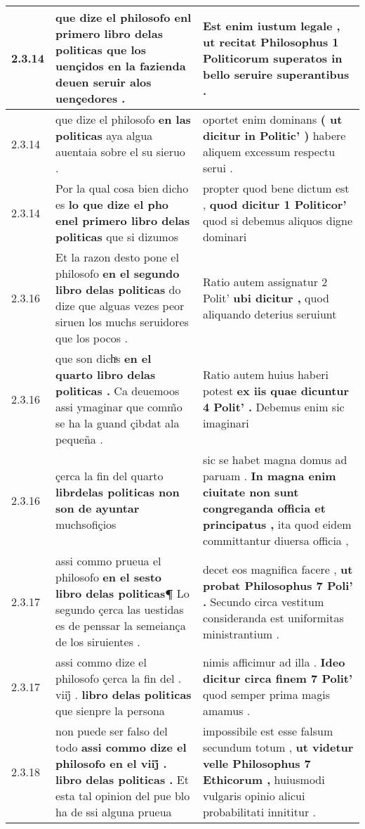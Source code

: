\begin{tabular}{|p{1cm}|p{6.5cm}|p{6.5cm}|}
2.3.14 & que dize el philosofo \textbf{ enl primero libro delas politicas } que los uençidos en la fazienda deuen seruir alos uençedores . & Est enim iustum legale , \textbf{ ut recitat Philosophus 1 Politicorum superatos } in bello seruire superantibus . \\\hline
2.3.14 & que dize el philosofo \textbf{ en las politicas } aya algua auentaia sobre el su sieruo . & oportet enim dominans \textbf{ ( ut dicitur in Politic’ ) } habere aliquem excessum respectu serui . \\\hline
2.3.14 & Por la qual cosa bien dicho es \textbf{ lo que dize el pho enel primero libro delas politicas } que si dizumos & propter quod bene dictum est , \textbf{ quod dicitur 1 Politicor’ } quod si debemus aliquos digne dominari \\\hline
2.3.16 & Et la razon desto pone el philosofo \textbf{ en el segundo libro delas politicas } do dize que alguas vezes peor siruen los muchs seruidores que los pocos . & Ratio autem assignatur 2 Polit’ \textbf{ ubi dicitur , } quod aliquando deterius seruiunt \\\hline
2.3.16 & que son dichͣs \textbf{ en el quarto libro delas politicas . } Ca deuemoos assi ymaginar que comm̃o se ha la guand çibdat ala pequeña . & Ratio autem huius haberi potest \textbf{ ex iis quae dicuntur 4 Polit’ . } Debemus enim sic imaginari \\\hline
2.3.16 & çerca la fin del quarto \textbf{ librdelas politicas non son de ayuntar } muchsofiçios & sic se habet magna domus ad paruam . \textbf{ In magna enim ciuitate non sunt congreganda officia et principatus , } ita quod eidem committantur diuersa officia , \\\hline
2.3.17 & assi commo prueua el philosofo \textbf{ en el sesto libro delas politicas¶ } Lo segundo çerca las uestidas es de penssar la semeiança de los siruientes . & decet eos magnifica facere , \textbf{ ut probat Philosophus 7 Poli’ . } Secundo circa vestitum consideranda est uniformitas ministrantium . \\\hline
2.3.17 & assi commo dize el philosofo çerca la fin del . viij̊ . \textbf{ libro delas politicas } que sienpre la persona & nimis afficimur ad illa . \textbf{ Ideo dicitur circa finem 7 Polit’ } quod semper prima magis amamus . \\\hline
2.3.18 & non puede ser falso del todo \textbf{ assi commo dize el philosofo en el viij̊ . libro delas politicas . } Et esta tal opinion del pue blo ha de ssi alguna prueua & impossibile est esse falsum secundum totum , \textbf{ ut videtur velle Philosophus 7 Ethicorum , } huiusmodi vulgaris opinio alicui probabilitati innititur . \\\hline

\end{tabular}
